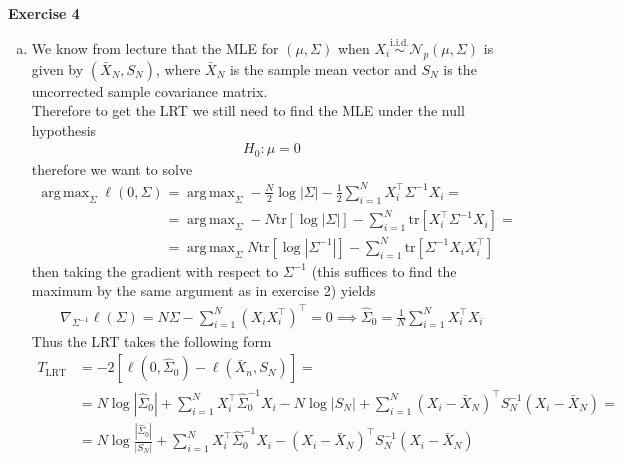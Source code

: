 \documentclass[10pt,notitlepage]{article}
\newcommand{\MBlue}[1]{{\color{MBlue}#1}}
\newcommand{\abs}[1]{\left\vert#1\right\vert}
\newcommand{\tr}[1]{\text{tr}\left[#1\right]}
\DeclareMathOperator*{\argmax}{arg\,max}
\begin{document}
    \newpage
    \textbf{\large \MBlue{Exercise 4}}
    \vskip10pt
    \noindent
	\begin{exercise}[Solution]
        \begin{enumerate}[(a)]
            \item We know from lecture that the MLE for $\left(\mu,\Sigma\right)$ when $X_i\overset{\text{i.i.d.}}{\sim}\mathcal{N}_p\left(\mu,\Sigma\right)$ is given by $\left(\bar{X}_N, S_N\right)$, where $\bar{X}_N$ is the sample mean vector and $S_N$ is the uncorrected sample covariance matrix.\\
                    Therefore to get the LRT we still need to find the MLE under the null hypothesis
                    \begin{align*}
                        H_0: \mu=0
                    \end{align*}
                    therefore we want to solve
                    \begin{align*}
                        \argmax_{\Sigma} \ell(0,\Sigma) &= \argmax_{\Sigma}-\frac{N}{2}\log\abs{\Sigma}-\frac{1}{2}\sum_{i=1}^{N}X_i^\top\Sigma^{-1}X_i = \\
                        &= \argmax_{\Sigma}-N\tr{\log\abs{\Sigma}}-\sum_{i=1}^{N}\tr{X_i^\top\Sigma^{-1}X_i} = \\
                        &= \argmax_{\Sigma}N\tr{\log\abs{\Sigma^{-1}}}-\sum_{i=1}^{N}\tr{\Sigma^{-1}X_i X_i^\top}
                    \end{align*}
                    then taking the gradient with respect to $\Sigma^{-1}$ (this suffices to find the maximum by the same argument as in exercise 2) yields 
                    \begin{align*}
                        \nabla_{\Sigma^{-1}}\ell(\Sigma) = N\Sigma - \sum_{i=1}^{N} \left(X_i X_i^\top\right)^\top = 0 \implies \hat{\Sigma}_0 = \frac{1}{N}\sum_{i=1}^{N} X_i^\top X_i
                    \end{align*}
                    Thus the LRT takes the following form 
                    \begin{align*}
                        T_{\text{LRT}} &= -2\left[\ell\left(0,\hat{\Sigma}_0\right)-\ell\left(\bar{X}_n,S_N\right)\right] = \\
                        &= N\log\abs{\hat{\Sigma}_0}+\sum_{i=1}^{N}X_i^\top\hat{\Sigma}_0^{-1}X_i - N\log\abs{S_N}+\sum_{i=1}^{N}\left(X_i-\bar{X}_N\right)^\top S_N^{-1}\left(X_i-\bar{X}_N\right) = \\
                        &= N\log\frac{\abs{\hat{\Sigma}_0}}{\abs{S_N}} + \sum_{i=1}^{N} X_i^\top\hat{\Sigma}_0^{-1}X_i - \left(X_i-\bar{X}_N\right)^\top S_N^{-1}\left(X_i-\bar{X}_N\right)

\end{align*}
\end{enumerate}
\end{exercise}
\end{document}
